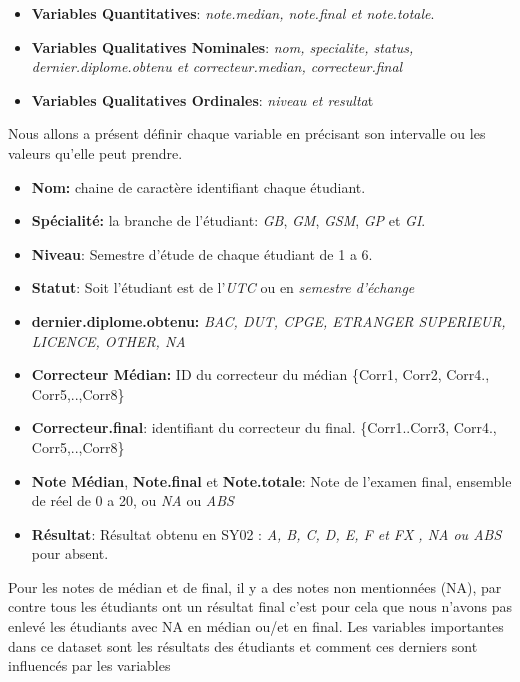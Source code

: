 \documentclass[10pt]{article}
\begin{document}
	\begin{itemize}
		\item \textbf{Variables Quantitatives}: \textit{note.median, note.final et  note.totale}.
		\item  \textbf{Variables Qualitatives Nominales}: \textit{nom, specialite, status, dernier.diplome.obtenu et correcteur.median, correcteur.final}
		\item  \textbf{Variables Qualitatives Ordinales}: \textit{niveau et resulta}t  \\
	\end{itemize}
	Nous allons a présent définir  chaque variable en précisant son intervalle ou les valeurs qu'elle peut prendre.
	
	\begin{itemize}
		\item \textbf{Nom:} chaine de caractère identifiant chaque étudiant.
		\item \textbf{Spécialité:} la branche de l'étudiant: \textit{GB}, \textit{GM}, \textit{GSM}, \textit{GP} et \textit{GI}.
		\item \textbf{Niveau}: Semestre d'étude de chaque étudiant de 1 a 6.
		\item \textbf{Statut}: Soit l'étudiant est de l'\textit{UTC} ou en \textit{semestre d'échange}
		\item \textbf{dernier.diplome.obtenu:}
		\textit{BAC, DUT, CPGE, ETRANGER SUPERIEUR, LICENCE, OTHER, NA}
		\item \textbf{Correcteur Médian:} ID du correcteur du médian \{Corr1, Corr2, Corr4., Corr5,..,Corr8\}	
		\item \textbf{Correcteur.final}: identifiant  du correcteur du final. \{Corr1..Corr3, Corr4., Corr5,..,Corr8\}
		\item \textbf{Note Médian},  \textbf{Note.final} et \textbf{Note.totale}:  Note de l'examen final, ensemble de réel de 0 a 20, ou \textit{NA} ou \textit{ABS}
		\item \textbf{Résultat}: Résultat obtenu en SY02 : \textit{A, B, C, D, E, F et FX , NA ou ABS} pour absent.
	\end{itemize}
	\vspace{0.9mm}
	Pour les notes de médian et de final, il y a des notes non mentionnées (NA), par contre tous les étudiants ont un résultat final c'est pour cela que nous n'avons pas enlevé les étudiants avec NA en médian ou/et en final. Les variables importantes dans ce dataset sont les résultats des étudiants et comment ces derniers sont influencés par les variables
	
\end{document}
